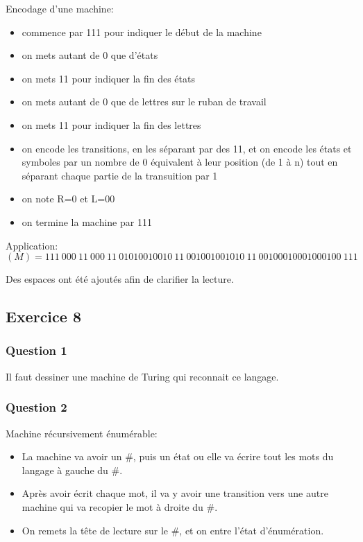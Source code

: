 Encodage d'une machine:
\begin{itemize}
  \item commence par 111 pour indiquer le début de la machine
  \item on mets autant de 0 que d'états
  \item on mets 11 pour indiquer la fin des états
  \item on mets autant de 0 que de lettres sur le ruban de travail
  \item on mets 11 pour indiquer la fin des lettres
  \item on encode les transitions, en les séparant par des 11, et on encode les états et symboles par un nombre de 0 équivalent à leur position (de 1 à n)
  tout en séparant chaque partie de la transuition par 1
  \item on note R=0 et L=00
  \item on termine la machine par 111
\end{itemize}

Application:
$$(M)=111~000~11~000~11~01010010010~11~001001001010~11~00100010001000100~111$$

Des espaces ont été ajoutés afin de clarifier la lecture.
\newpage

\subsection{Exercice 8}

\subsubsection{Question 1}

Il faut dessiner une machine de Turing qui reconnait ce langage.

\subsubsection{Question 2}

Machine récursivement énumérable:
\begin{itemize}
  \item La machine va avoir un \#, puis un état ou elle va écrire tout les mots du langage à gauche du \#.
  \item Après avoir écrit chaque mot, il va y avoir une transition vers une autre machine qui va recopier le mot à droite du \#.
  \item On remets la tête de lecture sur le \#, et on entre l'état d'énumération.
\end{itemize}

